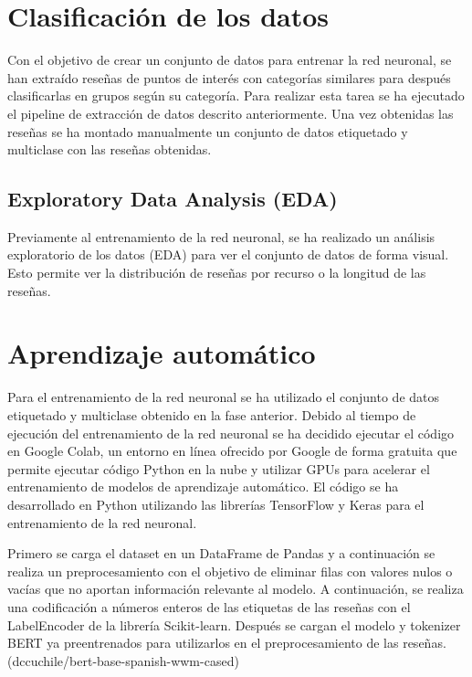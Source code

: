 \section{Clasificación de los datos}

Con el objetivo de crear un conjunto de datos para entrenar la red neuronal, se han extraído reseñas de puntos de interés con categorías similares 
para después clasificarlas en grupos según su categoría.
Para realizar esta tarea se ha ejecutado el pipeline de extracción de datos descrito anteriormente.
Una vez obtenidas las reseñas se ha montado manualmente un conjunto de datos etiquetado y multiclase con las reseñas obtenidas.

\subsection{Exploratory Data Analysis (EDA)}

Previamente al entrenamiento de la red neuronal, se ha realizado un análisis exploratorio de los datos (EDA) para ver el conjunto de datos de forma visual.
Esto permite ver la distribución de reseñas por recurso o la longitud de las reseñas.


\section{Aprendizaje automático}

Para el entrenamiento de la red neuronal se ha utilizado el conjunto de datos etiquetado y multiclase obtenido en la fase anterior.
Debido al tiempo de ejecución del entrenamiento de la red neuronal se ha decidido ejecutar el código en Google Colab, un entorno en línea
ofrecido por Google de forma gratuita que permite ejecutar código Python en la nube y utilizar GPUs para acelerar el entrenamiento de modelos de aprendizaje automático.
El código se ha desarrollado en Python utilizando las librerías TensorFlow y Keras para el entrenamiento de la red neuronal.

Primero se carga el dataset en un DataFrame de Pandas y a continuación se realiza un preprocesamiento con el objetivo de eliminar filas con valores nulos o vacías que no aportan información relevante al modelo.
A continuación, se realiza una codificación a números enteros de las etiquetas de las reseñas con el LabelEncoder de la librería Scikit-learn.
Después se cargan el modelo y tokenizer BERT ya preentrenados para utilizarlos en el preprocesamiento de las reseñas. (dccuchile/bert-base-spanish-wwm-cased)

